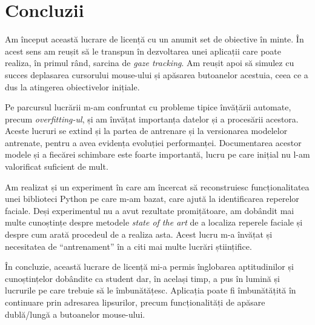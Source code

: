 \chapter*{Concluzii} 
Am început această lucrare de licență cu un anumit set de obiective în minte.
În acest sens am reușit să le transpun în dezvoltarea unei aplicații care poate realiza, în primul rând, sarcina de \emph{gaze tracking}.
Am reușit apoi să simulez cu succes deplasarea cursorului mouse-ului și apăsarea butoanelor acestuia, ceea ce a dus la atingerea obiectivelor inițiale.

Pe parcursul lucrării m-am confruntat cu probleme tipice învățării automate, precum \emph{overfitting-ul}, și am învățat importanța datelor și a procesării acestora.
Aceste lucruri se extind și la partea de antrenare și la versionarea modelelor antrenate, pentru a avea evidența evoluției performanței.
Documentarea acestor modele și a fiecărei schimbare este foarte importantă, lucru pe care inițial nu l-am valorificat suficient de mult.

Am realizat și un experiment în care am încercat să reconstruiesc funcționalitatea unei biblioteci Python pe care m-am bazat, care ajută la identificarea reperelor faciale.
Deși experimentul nu a avut rezultate promițătoare, am dobândit mai multe cunoștințe despre metodele \emph{state of the art} de a localiza reperele faciale și despre cum arată procedeul de a realiza asta.
Acest lucru m-a învățat și necesitatea de ``antrenament'' în a citi mai multe lucrări științifice.

În concluzie, această lucrare de licență mi-a permis înglobarea aptitudinilor și cunoștințelor dobândite ca student dar, în același timp, a pus în lumină și lucrurile pe care trebuie să le îmbunătățesc.
Aplicația poate fi îmbunătățită în continuare prin adresarea lipsurilor, precum funcționalități de apăsare dublă/lungă a butoanelor mouse-ului.